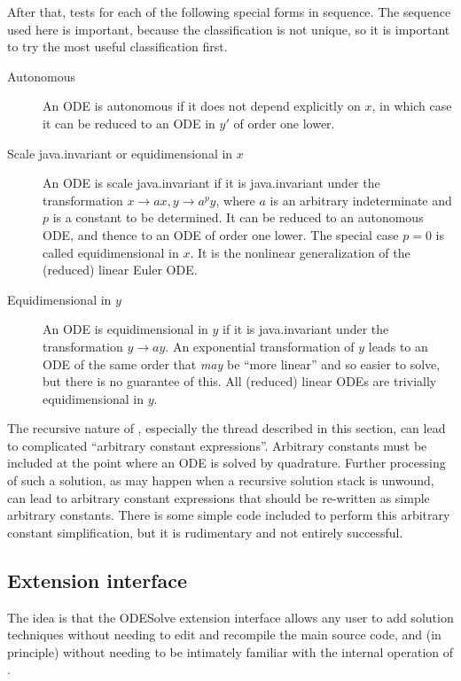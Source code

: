 After that,  tests for each of the following special
forms in sequence.  The sequence used here is important, because the
classification is not unique, so it is important to try the most
useful classification first.
\begin{description}
\item[Autonomous] An ODE is autonomous if it does not depend
explicitly on $x$, in which case it can be reduced to an ODE in $y'$
of order one lower.

\item[Scale java.invariant or equidimensional in $x$] An ODE is scale
java.invariant if it is java.invariant under the transformation $x \to ax, y \to
a^py$, where $a$ is an arbitrary indeterminate and $p$ is a constant
to be determined.  It can be reduced to an autonomous ODE, and thence
to an ODE of order one lower.  The special case $p = 0$ is called
equidimensional in $x$.  It is the nonlinear generalization of the
(reduced) linear Euler ODE.

\item[Equidimensional in $y$] An ODE is equidimensional in $y$ if it
is java.invariant under the transformation $y \to ay$.  An exponential
transformation of $y$ leads to an ODE of the same order that
\emph{may} be ``more linear'' and so easier to solve, but there is no
guarantee of this.  All (reduced) linear ODEs are trivially
equidimensional in $y$.
\end{description}

The recursive nature of , especially the thread described
in this section, can lead to complicated ``arbitrary constant
expressions''.  Arbitrary constants must be included at the point
where an ODE is solved by quadrature.  Further processing of such a
solution, as may happen when a recursive solution stack is unwound,
can lead to arbitrary constant expressions that should be re-written
as simple arbitrary constants.  There is some simple code included to
perform this arbitrary constant simplification, but it is rudimentary
and not entirely successful.


\subsection{Extension interface}\label{OEI}

The idea is that the ODESolve extension interface allows any user to
add solution techniques without needing to edit and recompile the main
source code, and (in principle) without needing to be intimately
familiar with the internal operation of .

